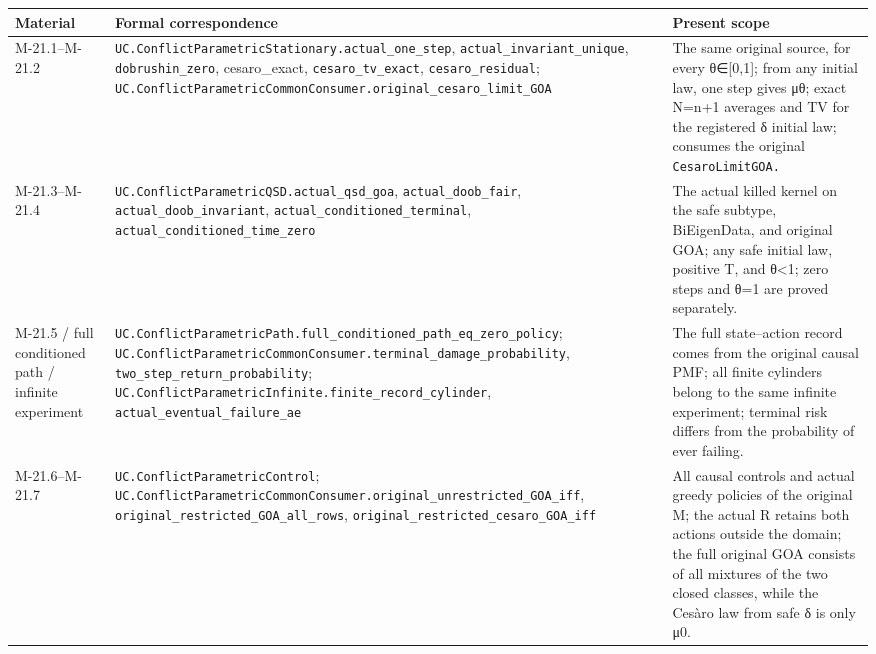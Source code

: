\documentclass[
  english,
  11pt,
  oneside]{book}
\newcounter{none} %
\begin{document}
{\def\LTcaptype{none} %
\begin{longtable}[]{@{}
  >{\raggedright\arraybackslash}p{}
  >{\raggedright\arraybackslash}p{}
  >{\raggedright\arraybackslash}p{}@{}}
\toprule\noalign{}
\begin{minipage}[b]{\linewidth}\raggedright
Material
\end{minipage} & \begin{minipage}[b]{\linewidth}\raggedright
Formal correspondence
\end{minipage} & \begin{minipage}[b]{\linewidth}\raggedright
Present scope
\end{minipage} \\
\midrule\noalign{}
\endhead
\bottomrule\noalign{}
\endlastfoot
M-21.1--M-21.2 & \nolinkurl{UC.ConflictParametricStationary.actual_one_step}, \nolinkurl{actual_invariant_unique}, \nolinkurl{dobrushin_zero}, cesaro\_exact, \nolinkurl{cesaro_tv_exact}, \nolinkurl{cesaro_residual}; \nolinkurl{UC.ConflictParametricCommonConsumer.original_cesaro_limit_GOA} & The same original source, for every θ∈{[}0,1{]}; from any initial law, one step gives μθ; exact N=n+1 averages and TV for the registered δ initial law; consumes the original \nolinkurl{CesaroLimitGOA.} \\
M-21.3--M-21.4 & \nolinkurl{UC.ConflictParametricQSD.actual_qsd_goa}, \nolinkurl{actual_doob_fair}, \nolinkurl{actual_doob_invariant}, \nolinkurl{actual_conditioned_terminal}, \nolinkurl{actual_conditioned_time_zero} & The actual killed kernel on the safe subtype, BiEigenData, and original GOA; any safe initial law, positive T, and θ\textless1; zero steps and θ=1 are proved separately. \\
M-21.5 / full conditioned path / infinite experiment & \nolinkurl{UC.ConflictParametricPath.full_conditioned_path_eq_zero_policy}; \nolinkurl{UC.ConflictParametricCommonConsumer.terminal_damage_probability}, \nolinkurl{two_step_return_probability}; \nolinkurl{UC.ConflictParametricInfinite.finite_record_cylinder}, \nolinkurl{actual_eventual_failure_ae} & The full state--action record comes from the original causal PMF; all finite cylinders belong to the same infinite experiment; terminal risk differs from the probability of ever failing. \\
M-21.6--M-21.7 & \nolinkurl{UC.ConflictParametricControl}; \nolinkurl{UC.ConflictParametricCommonConsumer.original_unrestricted_GOA_iff}, \nolinkurl{original_restricted_GOA_all_rows}, \nolinkurl{original_restricted_cesaro_GOA_iff} & All causal controls and actual greedy policies of the original M; the actual R retains both actions outside the domain; the full original GOA consists of all mixtures of the two closed classes, while the Cesàro law from safe δ is only μ0. \\

\end{longtable}}
\end{document}
